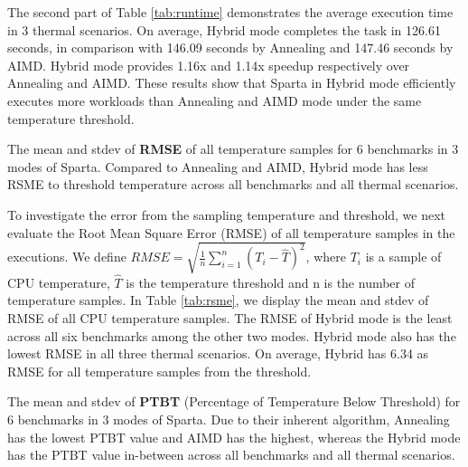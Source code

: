 The second part of Table \ref{tab:runtime} demonstrates the average execution time in 3 thermal scenarios. On average, Hybrid mode completes the task in 126.61 seconds, in comparison with 146.09 seconds by Annealing and 147.46 seconds by AIMD. Hybrid mode provides 1.16x and 1.14x speedup respectively over Annealing and AIMD. These results show that Sparta in Hybrid mode efficiently executes more workloads than Annealing and AIMD mode under the same temperature threshold. 



\begin{table}[t]
\caption{The mean and stdev of \textbf{RMSE} of all temperature samples for 6 benchmarks in 3 modes of Sparta. Compared to Annealing and AIMD, Hybrid mode has less RSME to threshold temperature across all benchmarks and all thermal scenarios.}\label{tab:rsme}
\vspace{1mm}
\centering
\resizebox{350pt}{!}{}
\newline
\vspace{3mm}
\newline
\resizebox{300pt}{!}{}
\end{table}


To investigate the error from the sampling temperature and threshold, we next evaluate the Root Mean Square Error (RMSE) of all temperature samples in the executions. We define $RMSE = \sqrt{\frac{1}{n}\sum_{i=1}^{n}(T_i - \hat{T})^2}$, where $T_i$ is a sample of CPU temperature, $\hat{T}$ is the temperature threshold and n is the number of temperature samples. In Table \ref{tab:rsme}, we display the mean and stdev of RMSE of all CPU temperature samples. The RMSE of Hybrid mode is the least across all six benchmarks among the other two modes. Hybrid mode also has the lowest RMSE in all three thermal scenarios. On average, Hybrid has 6.34 as RMSE for all temperature samples from the threshold. 


\begin{table}[t]
\caption{The mean and stdev of \textbf{PTBT} (Percentage of Temperature Below Threshold) for 6 benchmarks in 3 modes of Sparta. Due to their inherent algorithm, Annealing has the lowest PTBT value and AIMD has the highest, whereas the Hybrid mode has the PTBT value in-between across all benchmarks and all thermal scenarios.}\label{tab:percent}
\vspace{1mm}
\centering
\resizebox{350pt}{!}{}
\newline
\vspace{3mm}
\newline
\resizebox{300pt}{!}{}
\end{table}


